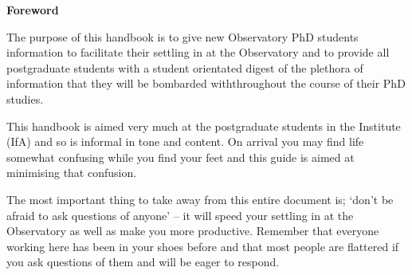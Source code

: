 \hspace{1in}

\Large {\bf Foreword} \normalsize

The purpose of this handbook is to give new Observatory PhD
students information to facilitate their settling in at the
Observatory and to provide all postgraduate students with a
student orientated digest of the plethora of information that 
they will be bombarded withthroughout the course of their PhD studies.


This handbook is aimed very much at the postgraduate students in
the Institute (IfA) and so is informal in tone and content. On arrival you may find life somewhat confusing while you find your feet and this guide is aimed
at minimising that confusion.


The most important thing to take away from this entire document is; 
`don't be afraid to ask questions of anyone' --
it will speed your settling in at the Observatory as well as make you more
productive. Remember that everyone working here has been in your shoes before
and that most people are flattered if you ask questions of them and
will be eager to respond. 




